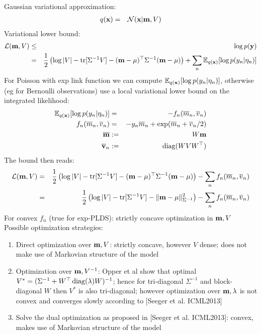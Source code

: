 \documentclass[10pt,english]{article}
\begin{document}
Gaussian variational approximation:
\begin{eqnarray}
 q(\mathbf{x})				&=&	\mathcal{N}(\mathbf{x}\vert\mathbf{m},V)
\end{eqnarray}
Variational lower bound:
\begin{eqnarray}
 \mathcal L(\mathbf{m},V)		&\leq& \log p(\mathbf{y})\\
				&=&	\frac{1}{2}\left(\log\vert V\vert-\operatorname{tr}[\Sigma^{-1}V]-(\mathbf{m}-\mu)^\top \Sigma^{-1}(\mathbf{m}-\mu)     \right)
					+\sum_{n} \mathbb{E}_{q(\mathbf{x})}[\log p(y_n\vert \eta_n)]
\end{eqnarray}
For Poisson with exp link function we can compute $\mathbb{E}_{q(\mathbf{x})}[\log p(y_n\vert \eta_n)]$, otherwise (eg for Bernoulli observations) use a local variational lower bound on the integrated likelihood:
\begin{eqnarray}
 \mathbb{E}_{q(\mathbf{x})}[\log p(y_n\vert \eta_n)]	&=& 	-f_n(\overline m_n,\overline v_n)\\
 f_n(\overline m_n,\overline v_n)	&=&	-y_n\overline m_n+\exp(\overline m_n+\overline v_n/2)\\
 \overline {\mathbf{m}}				&:=&	W\mathbf{m}\\
 \overline{ \mathbf{v}}_n		&:=&	\operatorname{diag}(WVW^\top)
\end{eqnarray}
The bound then reads:
\begin{eqnarray}
 \mathcal L(\mathbf{m},V)	&=&	\frac{1}{2}\left(\log\vert V\vert-\operatorname{tr}[\Sigma^{-1}V]-(\mathbf{m}-\mu)^\top \Sigma^{-1}(\mathbf{m}-\mu)     \right)
					-\sum_{n} f_n(\overline m_n,\overline v_n)\\
			&=&	\frac{1}{2}\left(\log\vert V\vert-\operatorname{tr}[\Sigma^{-1}V]-\Vert\mathbf{m}-\mu\Vert^2_{\Sigma^{-1}}    \right)-\sum_{n} f_n(\overline m_n,\overline v_n)
\end{eqnarray}
For convex $f_n$ (true for exp-PLDS): strictly concave optimization in $\mathbf{m},V$\\
Possible optimization strategies:
\begin{enumerate}
 \item Direct optimization over $\mathbf{m},V$: strictly concave, however $V$ dense; does not make use of Markovian structure of the model 
 \item Optimization over $\mathbf{m},V^{-1}$: Opper et al show that optimal $V^\ast=(\Sigma^{-1}+W^\top \operatorname{diag}(\lambda)W)^{-1}$; hence for tri-diagonal $\Sigma^{-1}$ and block-diagonal $W$ then
       $V^\ast$ is also tri-diagonal; however optimization over $\mathbf{m},\lambda$ is not convex and converges slowly according to [Seeger et al. ICML2013]
 \item Solve the dual optimization as proposed in [Seeger et al. ICML2013]: convex, makes use of Markovian structure of the model 
\end{enumerate}
\end{document}
